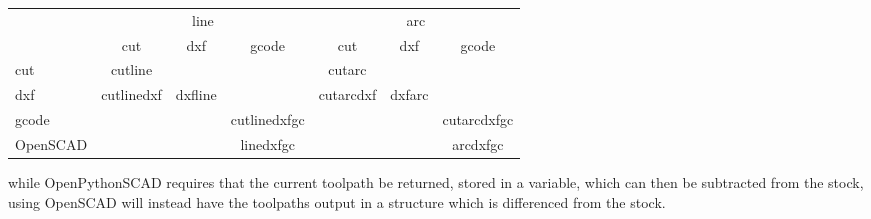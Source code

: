 \documentclass{ltxdoc}
\begin{document}
\addvspace{\baselineskip}

\noindent\begin{tabular}{lcccccc}\toprule
& \multicolumn{3}{c}{line} & \multicolumn{3}{c}{arc}
\\\cmidrule(lr){2-4}\cmidrule(lr){5-7}
      & cut                  & dxf     & gcode        & cut                 & dxf       & gcode       \\\midrule
cut   & cutline\hphantom{dxf}&         &              & cutarc\hphantom{dxf}&           &             \\
dxf   & cutlinedxf           & dxfline &              & cutarcdxf           & dxfarc    &             \\
gcode &                      &         & cutlinedxfgc &                     &           & cutarcdxfgc \\
OpenSCAD &                      &         & linedxfgc\hphantom{cut} &                     &           & arcdxfgc\hphantom{cut} \\\bottomrule
\end{tabular}

\addvspace{\baselineskip}

\noindent while OpenPythonSCAD requires that the current toolpath be returned, stored in a variable, which can then be subtracted from the stock, using OpenSCAD will instead have the toolpaths output in a structure which is differenced from the stock.

\addvspace{\baselineskip}

%
%
%
%
%
%
%
%
%
\end{document}
